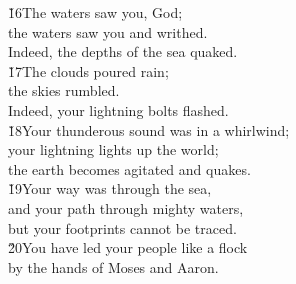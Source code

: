 \begin{poetry}
\poeml \v{16}The waters saw you, God; \\
\poemll    the waters saw you and writhed. \\
\poemlll       Indeed, the depths of the sea quaked. \\
\poeml \v{17}The clouds poured rain; \\
\poemll    the skies rumbled. \\
\poemlll       Indeed, your lightning bolts flashed. \\
\poeml \v{18}Your thunderous sound was in a whirlwind; \\
\poemll    your lightning lights up the world; \\
\poemlll       the earth becomes agitated and quakes. \\
\poeml \v{19}Your way was through the sea, \\
\poemll    and your path through mighty waters, \\
\poemlll       but your footprints cannot be traced. \\
\poeml \v{20}You have led your people like a flock \\
\poemll    by the hands of Moses and Aaron.
\end{poetry}

